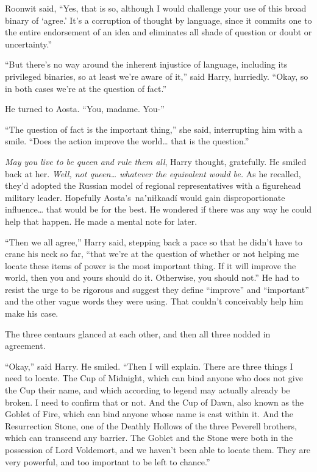 Roonwit said, ``Yes, that is so, although I would challenge your use of
this broad binary of `agree.' It's a corruption of thought by language,
since it commits one to the entire endorsement of an idea and eliminates
all shade of question or doubt or uncertainty.''

``But there's no way around the inherent injustice of language,
including its privileged binaries, so at least we're aware of it,'' said
Harry, hurriedly. ``Okay, so in both cases we're at the question of
fact.''

He turned to Aosta. ``You, madame. You-''

``The question of fact is the important thing,'' she said, interrupting
him with a smile. ``Does the action improve the world\ldots{} that is
the question.''

\emph{May you live to be queen and rule them all}, Harry thought,
gratefully. He smiled back at her. \emph{Well, not queen\ldots{}
whatever the equivalent would be.} As he recalled, they'd adopted the
Russian model of regional representatives with a figurehead military
leader. Hopefully Aosta's~naʼniłkaadí would gain disproportionate
influence\ldots{} that would be for the best. He wondered if there was
any way he could help that happen. He made a mental note for later.

``Then we all agree,'' Harry said, stepping back a pace so that he
didn't have to crane his neck so far, ``that we're at the question of
whether or not helping me locate these items of power is the most
important thing. If it will improve the world, then you and yours should
do it. Otherwise, you should not.'' He had to resist the urge to be
rigorous and suggest they define ``improve'' and ``important'' and the
other vague words they were using. That couldn't conceivably help him
make his case.

The three centaurs glanced at each other, and then all three nodded in
agreement.

``Okay,'' said Harry. He smiled. ``Then I will explain. There are three
things I need to locate. The Cup of Midnight, which can bind anyone who
does not give the Cup their name, and which according to legend may
actually already be broken. I need to confirm that or not. And the Cup
of Dawn, also known as the Goblet of Fire, which can bind anyone whose
name is cast within it. And the Resurrection Stone, one of the Deathly
Hollows of the three Peverell brothers, which can transcend any barrier.
The Goblet and the Stone were both in the possession of Lord Voldemort,
and we haven't been able to locate them. They are very powerful, and too
important to be left to chance.''

